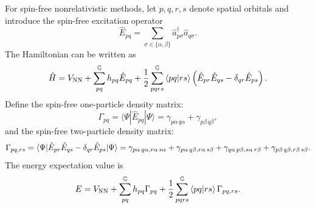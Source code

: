 \documentclass[aip,preprint]{revtex4-1}
\begin{document}
For spin-free nonrelativistic methods, let $p,q,r,s$ denote spatial orbitals and
introduce the spin-free excitation operator
\begin{equation}
\hat{E}_{pq}
=
\sum_{\sigma\in\{\alpha,\beta\}}
\hat{a}^\dagger_{p\sigma}\hat{a}_{q\sigma}.
\end{equation}
The Hamiltonian can be written as
\begin{equation}
\hat{H}
= V_\mathrm{NN} +
\sum_{pq}^{\mathbb{G}}h_{pq}\hat{E}_{pq}
+
\frac{1}{2}
\sum_{pqrs}^{\mathbb{G}}\braket{pq|rs}
\left(
\hat{E}_{pr}\hat{E}_{qs}
-
\delta_{qr}\hat{E}_{ps}
\right).
\label{eq:spinfree_hamiltonian}
\end{equation}
Define the spin-free one-particle density matrix:
\begin{equation}
\Gamma_{pq}
=
\langle \Psi | \hat{E}_{pq} | \Psi \rangle
= \gamma_{p\alpha \, q\alpha} + \gamma_{p\beta \, q\beta},
\label{eq:spinfree_1rdm}
\end{equation}
and the spin-free two-particle density matrix:
\begin{equation}
\Gamma_{pq,rs}
=
\braket{ \Psi |
\hat{E}_{pr}\hat{E}_{qs}
-
\delta_{qr}\hat{E}_{ps}
| \Psi }
=
\gamma_{p\alpha \, q\alpha, r\alpha \, s\alpha }
+ \gamma_{p\alpha \, q\beta, r\alpha \, s\beta }
+ \gamma_{q\alpha \, p\beta, s\alpha \, r\beta }
+ \gamma_{p\beta \, q\beta, r\beta \, s\beta }.
\label{eq:spinfree_2rdm}
\end{equation}
The energy expectation value is
\begin{equation}
E
= V_\mathrm{NN} +
\sum_{pq}^{\mathbb{G}} h_{pq}\Gamma_{pq}
+
\frac{1}{2}
\sum_{pqrs}^{\mathbb{G}} \braket{pq|rs}\Gamma_{pq,rs}.
\label{eq:spinfree_energy}
\end{equation}
\end{document}
